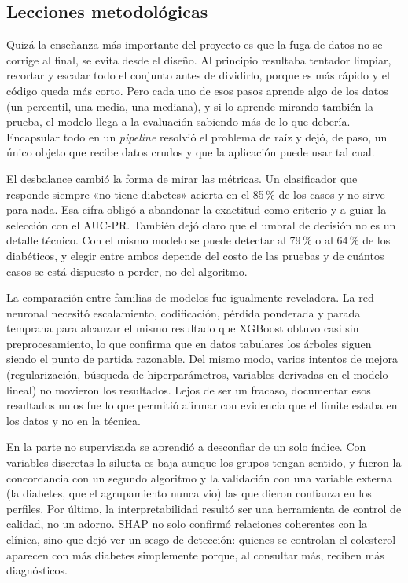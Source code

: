 \documentclass[conference,a4paper]{IEEEtran}
\begin{document}
\subsection{Lecciones metodológicas}
Quizá la enseñanza más importante del proyecto es que la fuga de datos no se corrige al final, se evita desde el diseño. Al principio resultaba tentador limpiar, recortar y escalar todo el conjunto antes de dividirlo, porque es más rápido y el código queda más corto. Pero cada uno de esos pasos aprende algo de los datos (un percentil, una media, una mediana), y si lo aprende mirando también la prueba, el modelo llega a la evaluación sabiendo más de lo que debería. Encapsular todo en un \textit{pipeline} resolvió el problema de raíz y dejó, de paso, un único objeto que recibe datos crudos y que la aplicación puede usar tal cual.

El desbalance cambió la forma de mirar las métricas. Un clasificador que responde siempre «no tiene diabetes» acierta en el 85\,\% de los casos y no sirve para nada. Esa cifra obligó a abandonar la exactitud como criterio y a guiar la selección con el AUC-PR. También dejó claro que el umbral de decisión no es un detalle técnico. Con el mismo modelo se puede detectar al 79\,\% o al 64\,\% de los diabéticos, y elegir entre ambos depende del costo de las pruebas y de cuántos casos se está dispuesto a perder, no del algoritmo.

La comparación entre familias de modelos fue igualmente reveladora. La red neuronal necesitó escalamiento, codificación, pérdida ponderada y parada temprana para alcanzar el mismo resultado que XGBoost obtuvo casi sin preprocesamiento, lo que confirma que en datos tabulares los árboles siguen siendo el punto de partida razonable. Del mismo modo, varios intentos de mejora (regularización, búsqueda de hiperparámetros, variables derivadas en el modelo lineal) no movieron los resultados. Lejos de ser un fracaso, documentar esos resultados nulos fue lo que permitió afirmar con evidencia que el límite estaba en los datos y no en la técnica.

En la parte no supervisada se aprendió a desconfiar de un solo índice. Con variables discretas la silueta es baja aunque los grupos tengan sentido, y fueron la concordancia con un segundo algoritmo y la validación con una variable externa (la diabetes, que el agrupamiento nunca vio) las que dieron confianza en los perfiles. Por último, la interpretabilidad resultó ser una herramienta de control de calidad, no un adorno. SHAP no solo confirmó relaciones coherentes con la clínica, sino que dejó ver un sesgo de detección: quienes se controlan el colesterol aparecen con más diabetes simplemente porque, al consultar más, reciben más diagnósticos.
\end{document}
